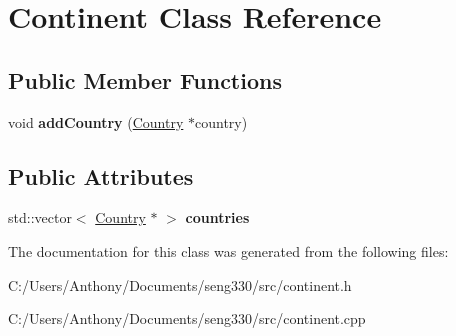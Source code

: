 \hypertarget{class_continent}{}\section{Continent Class Reference}
\label{class_continent}
\subsection*{Public Member Functions}
\begin{DoxyCompactItemize}
\item 
\hypertarget{class_continent_a734a82cb03fbd7edebd9088b72b75f9d}{}void {\bfseries add\+Country} (\hyperlink{class_country}{Country} $\ast$country)\label{class_continent_a734a82cb03fbd7edebd9088b72b75f9d}

\end{DoxyCompactItemize}
\subsection*{Public Attributes}
\begin{DoxyCompactItemize}
\item 
\hypertarget{class_continent_a095993408efbfeb34c4e9b6b649e7f20}{}std\+::vector$<$ \hyperlink{class_country}{Country} $\ast$ $>$ {\bfseries countries}\label{class_continent_a095993408efbfeb34c4e9b6b649e7f20}

\end{DoxyCompactItemize}


The documentation for this class was generated from the following files\+:\begin{DoxyCompactItemize}
\item 
C\+:/\+Users/\+Anthony/\+Documents/seng330/src/continent.\+h\item 
C\+:/\+Users/\+Anthony/\+Documents/seng330/src/continent.\+cpp\end{DoxyCompactItemize}
